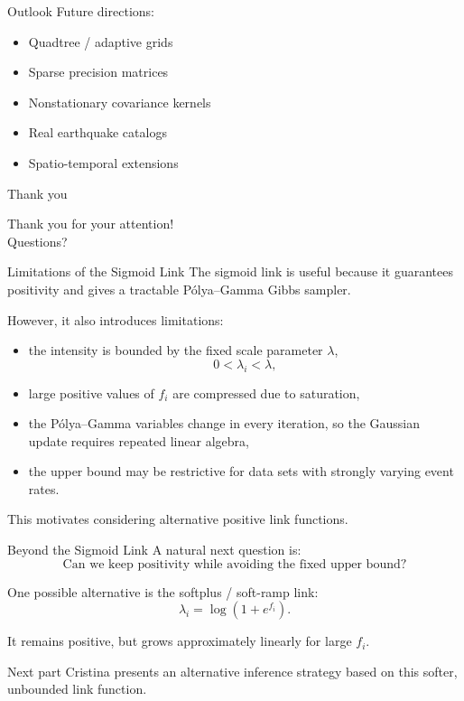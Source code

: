 \documentclass[11pt]{beamer}
\begin{document}
\begin{frame}{Outlook}
Future directions:
\begin{itemize}
\item Quadtree / adaptive grids
\item Sparse precision matrices
\item Nonstationary covariance kernels
\item Real earthquake catalogs
\item Spatio-temporal extensions
\end{itemize}
\end{frame}

\begin{frame}{Thank you}
\begin{center}
\Large Thank you for your attention!\\[1em]
Questions?
\end{center}
\end{frame}

\begin{frame}{Limitations of the Sigmoid Link}
The sigmoid link is useful because it guarantees positivity and gives a tractable P\'olya--Gamma Gibbs sampler.

\medskip
However, it also introduces limitations:
\begin{itemize}
\item the intensity is bounded by the fixed scale parameter $\lambda$,
\[
0<\lambda_i<\lambda,
\]
\item large positive values of $f_i$ are compressed due to saturation,
\item the P\'olya--Gamma variables change in every iteration, so the Gaussian update requires repeated linear algebra,
\item the upper bound may be restrictive for data sets with strongly varying event rates.
\end{itemize}

\medskip
This motivates considering alternative positive link functions.
\end{frame}

\begin{frame}{Beyond the Sigmoid Link}
A natural next question is:
\[
\text{Can we keep positivity while avoiding the fixed upper bound?}
\]

\medskip
One possible alternative is the softplus / soft-ramp link:
\[
\lambda_i = \log(1+e^{f_i}).
\]

\medskip
It remains positive, but grows approximately linearly for large $f_i$.

\begin{block}{Next part}
Cristina presents an alternative inference strategy based on this softer, unbounded link function.
\end{block}
\end{frame}
\end{document}
